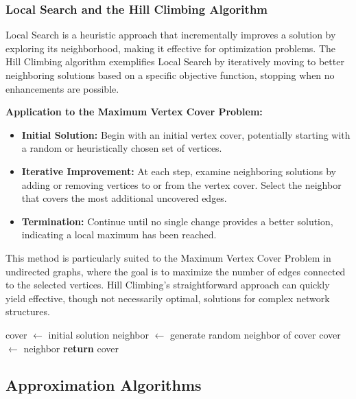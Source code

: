 \subsubsection{Local Search and the Hill Climbing Algorithm}

Local Search is a heuristic approach that incrementally improves a solution by exploring its neighborhood, making it effective for optimization problems. The Hill Climbing algorithm exemplifies Local Search by iteratively moving to better neighboring solutions based on a specific objective function, stopping when no enhancements are possible.

\textbf{Application to the Maximum Vertex Cover Problem:}
\begin{itemize}
    \item \textbf{Initial Solution:} Begin with an initial vertex cover, potentially starting with a random or heuristically chosen set of vertices.
    \item \textbf{Iterative Improvement:} At each step, examine neighboring solutions by adding or removing vertices to or from the vertex cover. Select the neighbor that covers the most additional uncovered edges.
    \item \textbf{Termination:} Continue until no single change provides a better solution, indicating a local maximum has been reached.
\end{itemize}

This method is particularly suited to the Maximum Vertex Cover Problem in undirected graphs, where the goal is to maximize the number of edges connected to the selected vertices. Hill Climbing's straightforward approach can quickly yield effective, though not necessarily optimal, solutions for complex network structures.

\FloatBarrier
\begin{algorithm}
\caption{Hill Climbing for Maximum Vertex Cover}\label{hill_climbing_vc}
\begin{algorithmic}[1]
\State cover $\gets$ initial solution
    \State neighbor $\gets$ generate random neighbor of cover
        \State cover $\gets$ neighbor
    \EndIf
\EndWhile
\State \textbf{return} cover
\EndProcedure
\end{algorithmic}
\end{algorithm}

\FloatBarrier

\subsection{Approximation Algorithms}

